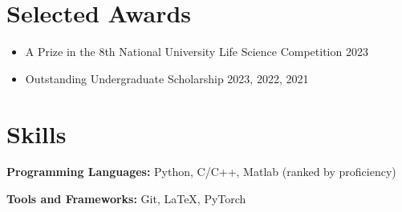 \documentclass{resume}
\begin{document}
\section{Selected Awards}
\begin{itemize}
    \item A Prize in the 8th National University Life Science Competition \hfill 2023
    \item Outstanding Undergraduate Scholarship  \hfill 2023, 2022, 2021
\end{itemize}


\section{Skills}
\textbf{Programming Languages:} \small Python, C/C++, Matlab (ranked by proficiency)

\textbf{Tools and Frameworks:} \small Git, \LaTeX, PyTorch
\end{document}
